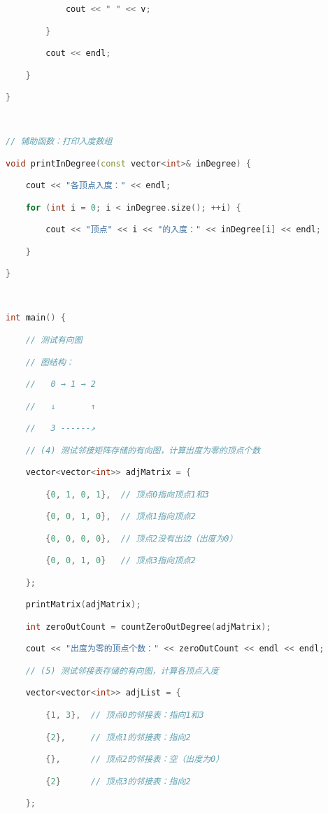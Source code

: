 \begin{lstlisting}[language=C++]
            cout << " " << v;

        }

        cout << endl;

    }

}

  

// 辅助函数：打印入度数组

void printInDegree(const vector<int>& inDegree) {

    cout << "各顶点入度：" << endl;

    for (int i = 0; i < inDegree.size(); ++i) {

        cout << "顶点" << i << "的入度：" << inDegree[i] << endl;

    }

}

  

int main() {

    // 测试有向图

    // 图结构：

    //   0 → 1 → 2

    //   ↓       ↑

    //   3 ------↗

    // (4) 测试邻接矩阵存储的有向图，计算出度为零的顶点个数

    vector<vector<int>> adjMatrix = {

        {0, 1, 0, 1},  // 顶点0指向顶点1和3

        {0, 0, 1, 0},  // 顶点1指向顶点2

        {0, 0, 0, 0},  // 顶点2没有出边（出度为0）

        {0, 0, 1, 0}   // 顶点3指向顶点2

    };

    printMatrix(adjMatrix);

    int zeroOutCount = countZeroOutDegree(adjMatrix);

    cout << "出度为零的顶点个数：" << zeroOutCount << endl << endl;

    // (5) 测试邻接表存储的有向图，计算各顶点入度

    vector<vector<int>> adjList = {

        {1, 3},  // 顶点0的邻接表：指向1和3

        {2},     // 顶点1的邻接表：指向2

        {},      // 顶点2的邻接表：空（出度为0）

        {2}      // 顶点3的邻接表：指向2

    };


\end{lstlisting}
